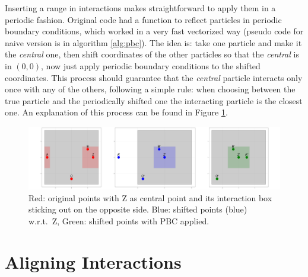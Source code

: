 \documentclass[../../master_thesis_np.tex]{subfiles}
\begin{document}
	Inserting a range in interactions makes straightforward to apply them in a periodic fashion. Original code had a function to reflect particles in periodic boundary conditions, which worked in a very fast vectorized way (pseudo code for naive version is in algorithm \ref{alg:pbc}). The idea is: take one particle and make it the \emph{central} one, then shift coordinates of the other particles so that the \emph{central} is in $(0,0)$, now just apply periodic boundary conditions to the shifted coordinates. This process should guarantee that the \emph{central} particle interacts only once with any of the others, following a simple rule: when choosing between the true particle and the periodically shifted one the interacting particle is the closest one. An explanation of this process can be found in Figure \ref{fig:periodicint}.
	
	\begin{figure}[htp]
		\centering
		\includegraphics[width=\textwidth]{periodic_interaction.png}
		\caption{Red: original points with Z as central point and its interaction box sticking out on the opposite side. Blue: shifted points (blue) w.r.t.\ Z, Green: shifted points with PBC applied.}
		\label{fig:periodicint}
	\end{figure}
	
	\section{Aligning Interactions}
	
\end{document}

